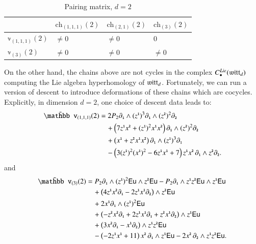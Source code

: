 \documentclass[main.tex]{subfiles}
\begin{document}
\begin{table}[!h]
        \centering
        
\begin{tabular}{|p{}|p{}|p{}|p{}|}
\hline 
  & $\displaystyle \mathrm{ch}_{(1,1,1)}(2)$ & $\displaystyle \mathrm{ch}_{(2,1)}(2)$ & $\displaystyle \mathrm{ch}_{(3)}(2)$ \\
\hline 
 $\displaystyle \mathbb{v}_{(1,1,1)}( 2)$ & $\displaystyle \neq 0$ & $\displaystyle \neq 0$ & $\displaystyle 0$ \\
\hline 
 $\displaystyle \mathbb{v}_{(3)}( 2)$ & $\displaystyle \neq 0$ & $\displaystyle \neq 0$ & $\displaystyle \neq 0$ \\
 \hline
\end{tabular}
\caption{Pairing matrix, $d=2$}
\label{tbl:pairing2}
        \end{table}

On the other hand, the chains above are not cycles in the complex $C_\bullet^{Lie}(\mathfrak{witt}_d)$ computing the Lie
algebra hyperhomology of $\mathfrak{witt}_d$.
Fortunately, we can run a version of descent to introduce deformations of these chains which are cocycles.
Explicitly, in dimension $d=2$, one choice of descent data leads to:
\begin{align*}
\til{\mathbb v}_{(1,1,1)}(2)
&=
2P_2\partial_{\1}\wedge (z^{\1})^3\partial_{\1}\wedge (z^{\2})^2\partial_{\2}
\\
&\quad
+
\left(
7z^{\1}x^{\2}
+
  (z^{\1})^2x^{\1}x^{\2}
\right)
\partial_{\1}\wedge (z^{\2})^2\partial_{\2}
\\
&\quad
+
\left(
x^{\1}
+
z^{\2}x^{\1}x^{\2}
\right)
\partial_{\1}\wedge (z^{\1})^3\partial_{\1}
\\
&\quad
-
\left(
3(z^{\1})^2(x^{\1})^2
-
6z^{\1}x^{\1}
+
7
\right)
z^{\1}x^{\2}\,
\partial_{\1}\wedge z^{\2}\partial_{\2}.
\end{align*}
and
\begin{align*}
  \til{\mathbb v}_{(3)}(2)
&=
P_2\partial_{\1}\wedge (z^{\1})^2\mathsf{Eu}\wedge z^{\2}\mathsf{Eu}
-
P_2\partial_{\1}\wedge z^{\1}z^{\2}\mathsf{Eu}\wedge z^{\1}\mathsf{Eu}
\\
&\quad
+
\left(4z^{\1}x^{\2}\partial_{\1}-2z^{\1}x^{\1}\partial_{\2}\right)\wedge z^{\2}\mathsf{Eu}
\\
&\quad
+
2x^{\1}\partial_{\1}\wedge (z^{\1})^2\mathsf{Eu}
\\
&\quad
+
\left(
-z^{\2}x^{\2}\partial_{\1}
+
2z^{\1}x^{\1}\partial_{\1}
+
z^{\2}x^{\1}\partial_{\2}
\right)
\wedge z^{\1}\mathsf{Eu}
\\
&\quad
+
\left(3x^{\2}\partial_{\1}-x^{\1}\partial_{\2}\right)\wedge z^{\1}z^{\2}\mathsf{Eu}
\\
&\quad
-
\left(
-2z^{\1}x^{\1}+11
\right)x^{\2}\,
\partial_{\1}\wedge z^{\1}\mathsf{Eu}
-
2x^{\2}\,
\partial_{\2}\wedge z^{\1}z^{\2}\mathsf{Eu}.
\end{align*}
\end{document}

